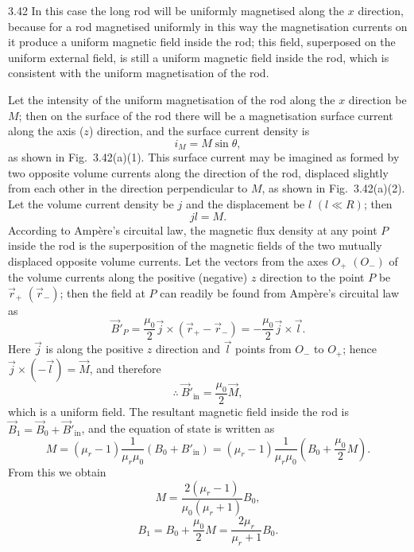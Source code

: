 \begin{solution}{3.42}
In this case the long rod will be uniformly magnetised along the $x$ direction, because for a rod magnetised uniformly in this way the magnetisation currents on it produce a uniform magnetic field inside the rod; this field, superposed on the uniform external field, is still a uniform magnetic field inside the rod, which is consistent with the uniform magnetisation of the rod.

Let the intensity of the uniform magnetisation of the rod along the $x$ direction be $M$; then on the surface of the rod there will be a magnetisation surface current along the axis ($z$) direction, and the surface current density is
\[
i_M=M\sin\theta,
\]
as shown in Fig.~3.42(a)(1). This surface current may be imagined as formed by two opposite volume currents along the direction of the rod, displaced slightly from each other in the direction perpendicular to $M$, as shown in Fig.~3.42(a)(2). Let the volume current density be $j$ and the displacement be $l$ $(l\ll R)$; then
\[
jl=M.
\]
According to Amp\`ere's circuital law, the magnetic flux density at any point $P$ inside the rod is the superposition of the magnetic fields of the two mutually displaced opposite volume currents. Let the vectors from the axes $O_+$ $(O_-)$ of the volume currents along the positive (negative) $z$ direction to the point $P$ be $\vec{r}_+$ $(\vec{r}_-)$; then the field at $P$ can readily be found from Amp\`ere's circuital law as
\[
\vec{B}'_P=\frac{\mu_0}{2}\vec{j}\times\left(\vec{r}_+-\vec{r}_-\right)
=-\frac{\mu_0}{2}\vec{j}\times\vec{l}.
\]
Here $\vec{j}$ is along the positive $z$ direction and $\vec{l}$ points from $O_-$ to $O_+$; hence $\vec{j}\times(-\vec{l})=\vec{M}$, and therefore
\[
\therefore\ \vec{B}'_{\text{in}}=\frac{\mu_0}{2}\vec{M},
\]
which is a uniform field. The resultant magnetic field inside the rod is $\vec{B}_1=\vec{B}_0+\vec{B}'_{\text{in}}$, and the equation of state is written as
\[
M=(\mu_r-1)\frac{1}{\mu_r\mu_0}\left(B_0+B'_{\text{in}}\right)
=(\mu_r-1)\frac{1}{\mu_r\mu_0}\left(B_0+\frac{\mu_0}{2}M\right).
\]
From this we obtain
\[
M=\frac{2(\mu_r-1)}{\mu_0(\mu_r+1)}B_0,
\]
\[
B_1=B_0+\frac{\mu_0}{2}M=\frac{2\mu_r}{\mu_r+1}B_0.
\]


\end{solution}
